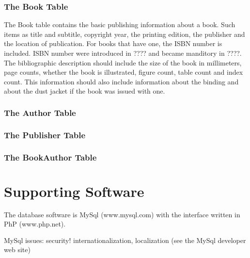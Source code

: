 \documentclass{article}%
\begin{document}
\subsubsection{The Book Table}
  The Book table contains the basic publishing information about a
book.  Such items as title and subtitle, copyright year, the printing
edition, the publisher and the location of publication.  For books
that have one, the ISBN number is included.  ISBN number were
introduced in ???? and became manditory in ????.  The bibliographic
description should include the size of the book in millimeters, page
counts, whether the book is illustrated, figure count, table count and
index count.  This information should also include information about
the binding and about the dust jacket if the book was issued with one.

\subsubsection{The Author Table}

\subsubsection{The Publisher Table}

\subsubsection{The BookAuthor Table}


%
%
\section{Supporting Software}
The database software is MySql (www.mysql.com) with the interface written
in PhP (www.php.net).

MySql issues: security! internationalization, localization (see the MySql
developer web site)

%
%
\end{document}
